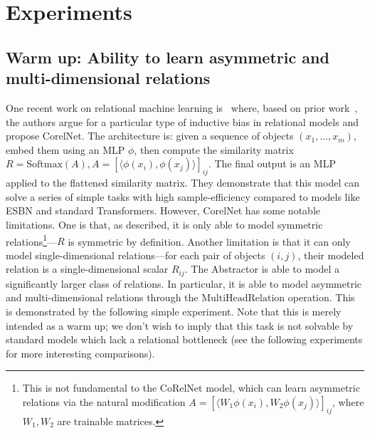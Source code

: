 
\section{Experiments}\label{sec:experiments}


\subsection{Warm up: Ability to learn asymmetric and multi-dimensional relations}
One recent work on relational machine learning is~\cite{kerg2022neural} where, based on prior work~\cite{esbn}, the
authors argue for a particular type of inductive bias in relational models and propose CorelNet. The architecture is: given a sequence of objects $(x_1, \ldots, x_m)$, embed them using an MLP $\phi$, then compute the similarity matrix $R = \text{Softmax}(A), A = {\left[\langle\phi(x_i), \phi(x_j)\rangle\right]}_{ij}$. The final output is an MLP applied to the flattened similarity matrix. They demonstrate that this model can solve a series of simple tasks with high sample-efficiency compared to models like ESBN and standard Transformers. However, CorelNet has some notable limitations. One is that, as described,
it is only able to model symmetric relations\footnote{This is not fundamental to the CoRelNet model, which can learn asymmetric relations via the natural modification $A = {\left[\langle W_1 \phi(x_i), W_2 \phi(x_j)\rangle\right]}_{ij}$, where $W_1, W_2$ are trainable matrices.}---$R$ is symmetric by definition.
Another limitation is that it can only model single-dimensional relations---for each pair of objects $(i,j)$, their modeled relation is a single-dimensional scalar $R_{ij}$. The Abstractor is able to model a significantly larger class of relations. In particular, it is able to model asymmetric and multi-dimensional relations through the $\text{MultiHeadRelation}$ operation. This is demonstrated by the following simple experiment. Note that this is merely intended as a warm up; we don't wish to imply that this task is not solvable by standard models which lack a relational bottleneck (see the following experiments for more interesting comparisons).

